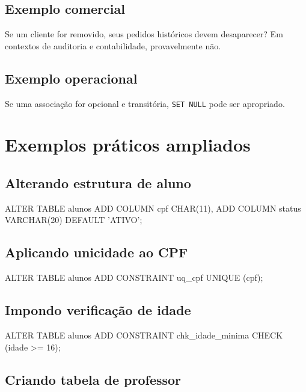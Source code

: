 \subsection{Exemplo comercial}

Se um cliente for removido, seus pedidos históricos devem desaparecer? Em contextos de auditoria e contabilidade, provavelmente não.

\subsection{Exemplo operacional}

Se uma associação for opcional e transitória, \texttt{SET NULL} pode ser apropriado.

\section{Exemplos práticos ampliados}

\subsection{Alterando estrutura de aluno}

\begin{sqlcode}
ALTER TABLE alunos
ADD COLUMN cpf CHAR(11),
ADD COLUMN status VARCHAR(20) DEFAULT 'ATIVO';
\end{sqlcode}

\subsection{Aplicando unicidade ao CPF}

\begin{sqlcode}
ALTER TABLE alunos
ADD CONSTRAINT uq_cpf UNIQUE (cpf);
\end{sqlcode}

\subsection{Impondo verificação de idade}

\begin{sqlcode}
ALTER TABLE alunos
ADD CONSTRAINT chk_idade_minima
CHECK (idade >= 16);
\end{sqlcode}

\subsection{Criando tabela de professor}

